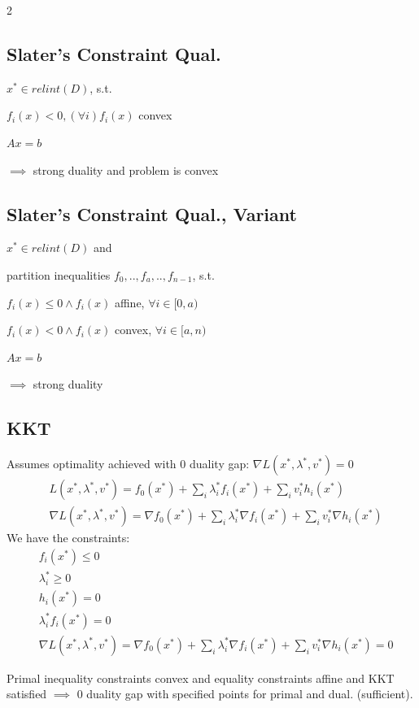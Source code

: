 \documentclass[8pt]{extarticle}
\begin{document}
\begin{multicols*}{2}
  \subsection{Slater's Constraint Qual.}
  
  $x^* \in relint(D)$, s.t.
  
  $f_i(x)<0, (\forall i) f_i(x)$ convex
  
  $Ax=b$

  $\implies$ strong duality and problem is convex

  \subsection{Slater's Constraint Qual., Variant}
  $x^* \in relint(D)$ and
  
  partition inequalities $f_0, .., f_a, .., f_{n-1}$, s.t.
  
  $f_i(x) \leq 0 \wedge f_i(x)$ affine, $\forall i \in [0,a)$
  
  $f_i(x) < 0 \wedge f_i(x)$ convex, $\forall i \in [a, n)$
  
  $Ax = b$
  
  $\implies$ strong duality
  
  \subsection{KKT}
  Assumes optimality achieved with 0 duality gap: $\nabla L(x^*,\lambda^*,v^*)=0$
  \begin{align*}
    &L(x^*,\lambda^*,v^*) = f_0(x^*) + \sum_i \lambda_i^* f_i(x^*) + \sum_i v_i^* h_i(x^*)\\
    &\nabla L(x^*,\lambda^*,v^*) = \nabla f_0(x^*) + \sum_i \lambda_i^* \nabla f_i(x^*) + \sum_i v_i^* \nabla h_i(x^*)
  \end{align*}
  We have the constraints:
  \begin{align*}
    &f_i(x^*) \leq 0\\
    &\lambda_i^* \geq 0\\
    &h_i(x^*)=0\\
    &\lambda_i^* f_i(x^*)=0\\
    &\nabla L(x^*,\lambda^*,v^*) = \nabla f_0(x^*) + \sum_i \lambda_i^* \nabla f_i(x^*) + \sum_i v_i^* \nabla h_i(x^*) = 0
  \end{align*}

  Primal inequality constraints convex and equality constraints affine and KKT satisfied $\implies$ 0 duality gap with specified points for primal and dual. (sufficient).\\


\end{multicols*}
\end{document}
